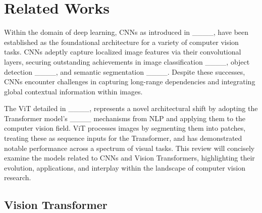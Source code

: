 \section{Related Works}
\label{sec2}


Within the domain of deep learning, CNNs as introduced in ____, 
have been established as the foundational architecture for a variety of computer vision tasks. 
CNNs adeptly capture localized image features via their convolutional layers, 
securing outstanding achievements in image classification ____, 
object detection ____, and semantic segmentation ____. 
Despite these successes, CNNs encounter challenges in capturing long-range dependencies and integrating global contextual information within images.

The ViT detailed in ____, represents a novel architectural shift by adopting the Transformer model's ____ mechanisms 
from NLP and applying them to the computer vision field. 
ViT processes images by segmenting them into patches, treating these as sequence inputs for the Transformer, 
and has demonstrated notable performance across a spectrum of visual tasks. 
This review will concisely examine the models related to CNNs and Vision Transformers, highlighting their evolution, applications, 
and interplay within the landscape of computer vision research.

\subsection{Vision Transformer}
\label{subsec:vit}

